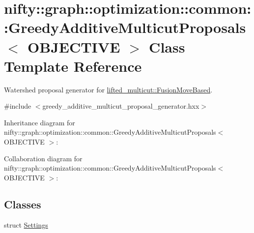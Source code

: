\hypertarget{classnifty_1_1graph_1_1optimization_1_1common_1_1GreedyAdditiveMulticutProposals}{}\section{nifty\+:\+:graph\+:\+:optimization\+:\+:common\+:\+:Greedy\+Additive\+Multicut\+Proposals$<$ O\+B\+J\+E\+C\+T\+I\+V\+E $>$ Class Template Reference}
\label{classnifty_1_1graph_1_1optimization_1_1common_1_1GreedyAdditiveMulticutProposals}


Watershed proposal generator for \hyperlink{classnifty_1_1graph_1_1lifted__multicut_1_1FusionMoveBased}{lifted\+\_\+multicut\+::\+Fusion\+Move\+Based}.  




{\ttfamily \#include $<$greedy\+\_\+additive\+\_\+multicut\+\_\+proposal\+\_\+generator.\+hxx$>$}



Inheritance diagram for nifty\+:\+:graph\+:\+:optimization\+:\+:common\+:\+:Greedy\+Additive\+Multicut\+Proposals$<$ O\+B\+J\+E\+C\+T\+I\+V\+E $>$\+:


Collaboration diagram for nifty\+:\+:graph\+:\+:optimization\+:\+:common\+:\+:Greedy\+Additive\+Multicut\+Proposals$<$ O\+B\+J\+E\+C\+T\+I\+V\+E $>$\+:
\subsection*{Classes}
\begin{DoxyCompactItemize}
\item 
struct \hyperlink{structnifty_1_1graph_1_1optimization_1_1common_1_1GreedyAdditiveMulticutProposals_1_1Settings}{Settings}
\end{DoxyCompactItemize}
